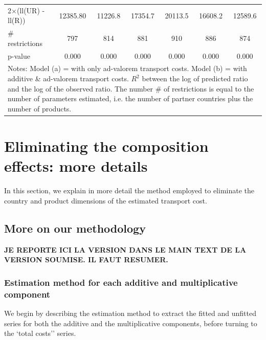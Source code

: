 \documentclass[a4paper,11pt]{article}
\begin{document}
\begin{table}[htbp]
\begin{center}
{\begin{tabular}{l|cccccc}
2$\times$(ll(UR) -ll(R)) & 12385.80 & 11226.8 & \multicolumn{1}{c}{17354.7} & \multicolumn{1}{c}{20113.5} & \multicolumn{1}{c}{16608.2} & \multicolumn{1}{c}{12589.6} \\
\# restrictions  & 797   & 814   & \multicolumn{1}{c}{881} & \multicolumn{1}{c}{910} & \multicolumn{1}{c}{886} & \multicolumn{1}{c}{874} \\
p-value & 0.000 & 0.000 & \multicolumn{1}{c}{0.000} & \multicolumn{1}{c}{0.000} & \multicolumn{1}{c}{0.000} & \multicolumn{1}{c}{0.000} \\
\hline\hline
\multicolumn{7}{l}{\parbox[l]{13cm}{ \vspace{7pt}\scriptsize{Notes: Model (a) = with only ad-valorem transport costs.
Model (b) = with additive \& ad-valorem
transport costs.
$R^{2}$ between the log of predicted ratio and the log of the observed ratio.
The number \# of restrictions is equal to the number of parameters estimated, i.e. the number of partner countries plus the number of products.}}}
\end{tabular}%
}
\end{center}
\end{table}%

\newpage


\clearpage
\setcounter{table}{0}
\setcounter{figure}{0}
\renewcommand{\thefigure}{D.\arabic{figure}}
\renewcommand{\thetable}{D.\arabic{table}}

\section{Eliminating the composition effects: more details \label{app:comp-effects}}

In this section, we explain in more detail the method employed to eliminate the country and product dimensions of the estimated transport cost.

\subsection{More on our methodology}

\textbf{JE REPORTE ICI LA VERSION DANS LE MAIN TEXT DE LA VERSION SOUMISE. IL FAUT RESUMER.}


\subsubsection{Estimation method for each additive and multiplicative component}

We begin by describing the estimation method to extract the fitted and unfitted series for both the additive and the multiplicative components, before turning to the `total costs'' series.
\smallskip
\end{document}
